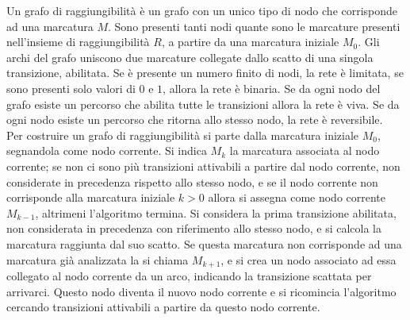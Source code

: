 \documentclass{article}
\numberwithin{equation}{subsection}
\begin{document}
Un grafo di raggiungibilità è un grafo con un unico tipo di nodo che corrisponde ad una marcatura $M$. Sono presenti tanti nodi quante sono le marcature presenti nell'insieme 
di raggiungibilità $R$, a partire da una marcatura iniziale $M_0$. Gli archi del grafo uniscono due marcature collegate dallo scatto di una singola transizione, abilitata. 
Se è presente un numero finito di nodi, la rete è limitata, se sono presenti solo valori di $0$ e $1$, allora la rete è binaria. Se da ogni nodo del grafo esiste un percorso 
che abilita tutte le transizioni allora la rete è viva. Se da ogni nodo esiste un percorso che ritorna allo stesso nodo, la rete è reversibile. 
\\
Per costruire un grafo di raggiungibilità si parte dalla marcatura iniziale $M_0$, segnandola come nodo corrente. Si indica $M_k$ la marcatura associata al nodo corrente; 
se non ci sono più transizioni attivabili a partire dal nodo corrente, non considerate in precedenza rispetto allo stesso nodo, e se il nodo corrente non corrisponde alla 
marcatura iniziale $k>0$ allora si assegna come nodo corrente $M_{k-1}$, altrimeni l'algoritmo termina. Si considera la prima transizione abilitata, non considerata in precedenza 
con riferimento allo stesso nodo, e si calcola la marcatura raggiunta dal suo scatto. Se questa marcatura non corrisponde ad una marcatura già analizzata la si chiama $M_{k+1}$, 
e si crea un nodo associato ad essa collegato al nodo corrente da un arco, indicando la transizione scattata per arrivarci. Questo nodo diventa il nuovo nodo corrente e si 
ricomincia l'algoritmo cercando transizioni attivabili a partire da questo nodo corrente.  
\begin{center}
\end{center}
\end{document}
